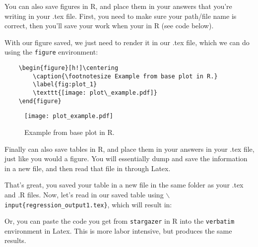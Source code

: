 \documentclass[12pt,letterpaper]{article}
\begin{document}
\noindent You can also save figures in R, and place them in your answers that you're writing in your .tex file. First, you need to make sure your path/file name is correct, then you'll save your work when your in R (see code below).

  
\vspace{.25cm}
\noindent With our figure saved, we just need to render it in our .tex file, which we can do using the \texttt{figure} environment:

\begin{verbatim}
	\begin{figure}[h!]\centering
		\caption{\footnotesize Example from base plot in R.}
		\label{fig:plot_1}
		\texttt{[image: plot\_example.pdf]}
	\end{figure}
\end{verbatim}

\begin{figure}[h!]\centering
	\caption{\footnotesize Example from base plot in R.}
	\label{fig:plot_1}
	\texttt{[image: plot\_example.pdf]}
\end{figure}

\noindent Finally can also save tables in R, and place them in your answers in your .tex file, just like you would a figure. You will essentially dump and save the information in a new file, and then read that file in through Latex.

  

\noindent That's great, you saved your table in a new file in the same folder as your .tex and .R files. Now, let's read in our saved table using \texttt{$\backslash$input\{regression\_output1.tex\}}, which will result in:



\noindent Or, you can paste the code you get from \texttt{stargazer} in R into the \texttt{verbatim} environment in Latex. This is more labor intensive, but produces the same results.
\end{document}
